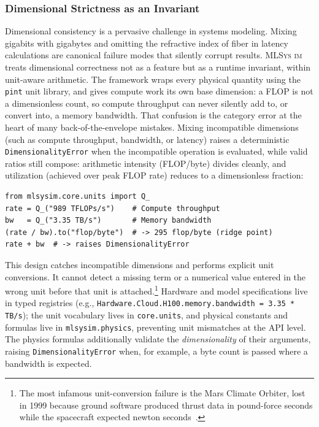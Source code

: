 \documentclass[10pt,twocolumn]{article}
\newcommand{\mlsysim}{\mbox{\textsc{MLSys}\,\textperiodcentered\,\textsc{im}}\xspace}
\begin{document}
\subsubsection{Dimensional Strictness as an Invariant}
\label{sec:dimensional}

Dimensional consistency is a pervasive challenge in systems modeling. Mixing gigabits with gigabytes and omitting the refractive index of fiber in latency calculations are canonical failure modes that silently corrupt results. \mlsysim treats dimensional correctness not as a feature but as a runtime invariant, within unit-aware arithmetic. The framework wraps every physical quantity using the \texttt{pint} unit library, and gives compute work its own base dimension: a FLOP is not a dimensionless count, so compute throughput can never silently add to, or convert into, a memory bandwidth. That confusion is the category error at the heart of many back-of-the-envelope mistakes. Mixing incompatible dimensions (such as compute throughput, bandwidth, or latency) raises a deterministic \texttt{DimensionalityError} when the incompatible operation is evaluated, while valid ratios still compose: arithmetic intensity (FLOP/byte) divides cleanly, and utilization (achieved over peak FLOP rate) reduces to a dimensionless fraction:

\begin{lstlisting}[caption={\textbf{Dimensional Strictness.} Prevents silent unit errors at the API level.},label={lst:units}]
from mlsysim.core.units import Q_
rate = Q_("989 TFLOPs/s")    # Compute throughput
bw   = Q_("3.35 TB/s")       # Memory bandwidth
(rate / bw).to("flop/byte")  # -> 295 flop/byte (ridge point)
rate + bw  # -> raises DimensionalityError
\end{lstlisting}

This design catches incompatible dimensions and performs explicit unit conversions. It cannot detect a missing term or a numerical value entered in the wrong unit before that unit is attached.\footnote{The most infamous unit-conversion failure is the Mars Climate Orbiter, lost in 1999 because ground software produced thrust data in pound-force seconds while the spacecraft expected newton seconds~\citep{stephenson1999mco}.} Hardware and model specifications live in typed registries (e.g., \texttt{Hardware.Cloud.H100.memory.bandwidth = 3.35\,*\,TB/s}); the unit vocabulary lives in \texttt{core.units}, and physical constants and formulas live in \texttt{mlsysim.physics}, preventing unit mismatches at the API level. The physics formulas additionally validate the \emph{dimensionality} of their arguments, raising \texttt{DimensionalityError} when, for example, a byte count is passed where a bandwidth is expected.
\end{document}
